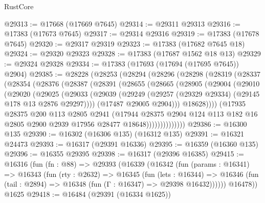 \begin{lexlean}{RustCore}
\begin{coremodule}
@29313 := @17668 (@17669 @7645)
@29314 := @29311 @29313
@29316 := @17383 (@17673 @7645)
@29317 := @29314 @29316
@29319 := @17383 (@17678 @7645)
@29320 := @29317 @29319
@29323 := @17383 (@17682 @7645 @18)
@29324 := @29320 @29323
@29328 := @17383 (@17687 @1562 @18 @13)
@29329 := @29324 @29328
@29334 := @17383 (@17693 (@17694 (@17695 @7645)) @2904)
@29385 := @28228
    (@28253
      (@28294
        (@28296
          (@28298
            (@28319
              (@28337
                (@28354
                  (@28376
                    (@28387
                      (@28391
                        (@28655
                          (@28665
                            (@28905
                              (@29004
                                (@29010
                                  (@29020
                                    (@29025
                                      (@29033
                                        (@29039
                                          (@29249
                                            (@29257
                                              (@29329 @29334)
                                              (@29145 @178 @13 @2876 @29297))))
                                        (@17487 @29005 @2904)))
                                    @18628))))
                            (@17935
                              @28375
                              @200
                              @113
                              @2805
                              @2941
                              (@17944
                                @28375
                                @2904
                                @124
                                @113
                                @182
                                @16
                                @2805
                                @2900
                                @2939
                                @17956
                                @28477
                                @18648))))))))))))))
@29386 := @16300 @135
@29390 := @16302 (@16306 @135) (@16312 @135)
@29391 := @16321 @24473
@29393 := @16317 (@29391 @16336)
@29395 := @16359 (@16360 @135)
@29396 := @16355 @29395
@29398 := @16317 (@29396 @16385)
@29415 := @16316
    (fun (fn : @88) =>
    @29393
      (@16339
        (@16342
          (fun (params : @16341) =>
          @16343
            (fun (rty : @2632) =>
            @16345
              (fun (lets : @16344) =>
              @16346 (fun (tail : @2894) => @16348 (fun (Γ : @16347) => @29398 @16432))))))
        @16478))
    @1625
@29418 := @16484 (@29391 (@16334 @1625))

\end{coremodule}
\end{lexlean}
